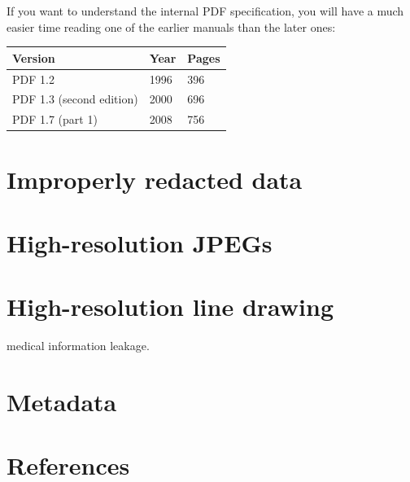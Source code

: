 If you want to understand the internal PDF specification, you will have a much
easier time reading one of the earlier manuals than the later ones:

\begin{tabular}{lll}
Version & Year & Pages \\
\hline
PDF 1.2 & 1996 & 396 \\
PDF 1.3 (second edition) & 2000 & 696 \\
PDF 1.7 (part 1) & 2008 & 756\\
\end{tabular}



\section{Improperly redacted data}
\section{High-resolution JPEGs}
\section{High-resolution line drawing}
medical information leakage.
\section{Metadata}
\section{References}



